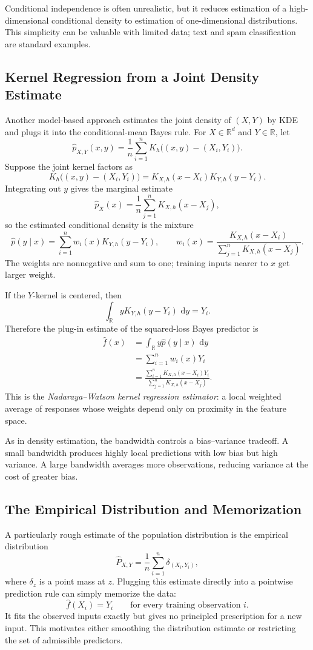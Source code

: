\documentclass[12pt,oneside]{book}
\numberwithin{equation}{section}
\theoremstyle{definition}
\theoremstyle{plain}
\theoremstyle{remark}
\newcommand{\R}{\mathbb{R}}
\newcommand{\dd}{\,\mathrm{d}}
\begin{document}
Conditional independence is often unrealistic, but it reduces estimation of a
high-dimensional conditional density to estimation of one-dimensional
distributions. This simplicity can be valuable with limited data; text and
spam classification are standard examples.

\subsection{Kernel Regression from a Joint Density Estimate}
Another model-based approach estimates the joint density of $(X,Y)$ by KDE and
plugs it into the conditional-mean Bayes rule. For $X\in\R^d$ and $Y\in\R$, let
\[
\widehat p_{X,Y}(x,y)
=\frac1n\sum_{i=1}^n
K_h\bigl((x,y)-(X_i,Y_i)\bigr).
\]
Suppose the joint kernel factors as
\[
K_h\bigl((x,y)-(X_i,Y_i)\bigr)
=K_{X,h}(x-X_i)K_{Y,h}(y-Y_i).
\]
Integrating out $y$ gives the marginal estimate
\[
\widehat p_X(x)=\frac1n\sum_{j=1}^nK_{X,h}(x-X_j),
\]
so the estimated conditional density is the mixture
\[
\widehat p(y\mid x)
=\sum_{i=1}^n w_i(x)K_{Y,h}(y-Y_i),
\qquad
w_i(x)=
\frac{K_{X,h}(x-X_i)}
{\sum_{j=1}^nK_{X,h}(x-X_j)}.
\]
The weights are nonnegative and sum to one; training inputs nearer to $x$ get
larger weight.

If the $Y$-kernel is centered, then
\[
\int_{\R} yK_{Y,h}(y-Y_i)\,\dd y=Y_i.
\]
Therefore the plug-in estimate of the squared-loss Bayes predictor is
\begin{align*}
\widehat f(x)
&=\int_{\R}y\widehat p(y\mid x)\,\dd y\\
&=\sum_{i=1}^nw_i(x)Y_i\\
&=\frac{\sum_{i=1}^nK_{X,h}(x-X_i)Y_i}
{\sum_{j=1}^nK_{X,h}(x-X_j)}.
\end{align*}
This is the \emph{Nadaraya--Watson kernel regression estimator}: a local
weighted average of responses whose weights depend only on proximity in the
feature space.

As in density estimation, the bandwidth controls a bias--variance tradeoff. A
small bandwidth produces highly local predictions with low bias but high
variance. A large bandwidth averages more observations, reducing variance at
the cost of greater bias.

\subsection{The Empirical Distribution and Memorization}
A particularly rough estimate of the population distribution is the empirical
distribution
\[
\widehat P_{X,Y}=\frac1n\sum_{i=1}^n\delta_{(X_i,Y_i)},
\]
where $\delta_z$ is a point mass at $z$. Plugging this estimate directly into a
pointwise prediction rule can simply memorize the data:
\[
\widehat f(X_i)=Y_i
\qquad\text{for every training observation }i.
\]
It fits the observed inputs exactly but gives no principled prescription for a
new input. This motivates either smoothing the distribution estimate or
restricting the set of admissible predictors.
\end{document}
